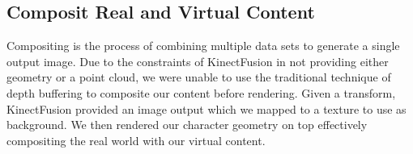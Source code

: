 \subsection{Composit Real and Virtual Content}
Compositing is the process of combining multiple data sets to generate a single output image. Due to the constraints of KinectFusion in not providing either geometry or a point cloud, we were unable to use the traditional technique of depth buffering \cite{catmull1974subdivision} to composite our content before rendering. Given a transform, KinectFusion provided an image output which we mapped to a texture to use as background. We then rendered our character geometry on top effectively compositing the real world with our virtual content.